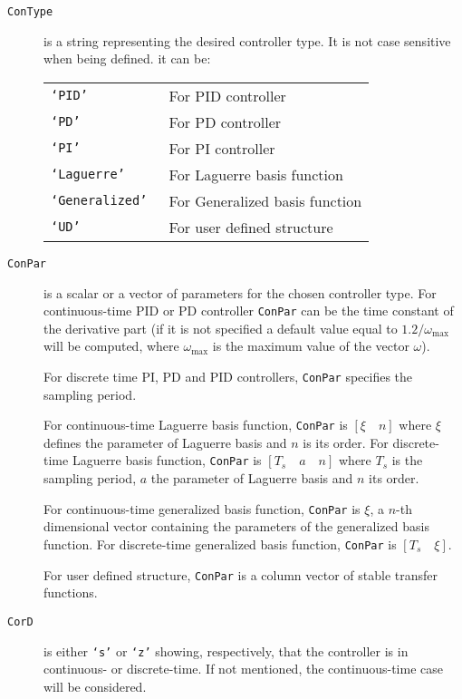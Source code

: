 \documentclass [12pt , a4paper] {report}
\begin{document}
\begin{description}
\item[\texttt{ConType}] is a string representing the desired controller type. It is not case sensitive when being defined. it can be:

  \begin{tabular}{ll}
       {\tt `PID'}     &    For PID controller \\
      {\tt `PD' }       & For PD controller\\
       {\tt `PI' }        &  For PI controller\\
      {\tt  `Laguerre' }  &  For Laguerre basis function\\
      {\tt  `Generalized' }  & For Generalized basis function\\
    {\tt `UD'}        &   For user defined structure 
\end{tabular}

\item[\texttt{ConPar}]  is a scalar or a vector of parameters for the chosen controller type.
For continuous-time PID or PD controller {\tt ConPar} can be the time constant
       of the derivative part (if it is not specified a default value equal to $1.2/\omega_{\max}$ will be computed, where $\omega_{\max}$ is the maximum value of the vector $\omega$).

For discrete time PI, PD and PID controllers, {\tt ConPar} specifies the sampling period.

For continuous-time  Laguerre basis function, {\tt ConPar} is $[\xi \quad n]$ where $\xi$ defines the parameter of 
       Laguerre basis and $n$ is its order. For discrete-time Laguerre basis function, {\tt ConPar} is 
       $[T_s \quad a \quad n]$ where $T_s$ is the sampling period, $a$ the parameter of Laguerre basis and $n$ its order.
       
       For continuous-time generalized basis function, {\tt ConPar} is $\xi$, a $n$-th
       dimensional vector containing the parameters of the generalized basis
       function. For discrete-time generalized basis function, {\tt ConPar} is
       $[T_s \quad \xi]$.

       For user defined structure, {\tt ConPar} is a column vector of stable
       transfer functions.

\item[\texttt{CorD}] is either \texttt{`s'} or \texttt{`z'} showing, respectively, that the controller is in continuous- or discrete-time. If not mentioned, the continuous-time case will be considered. 


\end{description}
\end{document}
